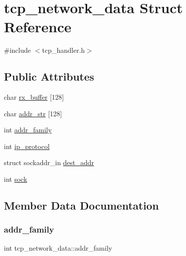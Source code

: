 \hypertarget{structtcp__network__data}{}\section{tcp\+\_\+network\+\_\+data Struct Reference}
\label{structtcp__network__data}


{\ttfamily \#include $<$tcp\+\_\+handler.\+h$>$}

\subsection*{Public Attributes}
\begin{DoxyCompactItemize}
\item 
char \hyperlink{structtcp__network__data_aec4bca454d64124cd3a4b001f4a551cc}{rx\+\_\+buffer} \mbox{[}128\mbox{]}
\item 
char \hyperlink{structtcp__network__data_a5bb07a33391c99faa2caab2ef4477944}{addr\+\_\+str} \mbox{[}128\mbox{]}
\item 
int \hyperlink{structtcp__network__data_a901043d5d480118c9e8661464465ae95}{addr\+\_\+family}
\item 
int \hyperlink{structtcp__network__data_ac9025540ea4138efba1544b3fbbb2db3}{ip\+\_\+protocol}
\item 
struct sockaddr\+\_\+in \hyperlink{structtcp__network__data_aac1fae2cd9f342a287fc728c2171e3d1}{dest\+\_\+addr}
\item 
int \hyperlink{structtcp__network__data_a78063825cce60cb5f121e2c87ccb6dbb}{sock}
\end{DoxyCompactItemize}


\subsection{Member Data Documentation}
\mbox{\label{structtcp__network__data_a901043d5d480118c9e8661464465ae95}} 
\subsubsection{\texorpdfstring{addr\+\_\+family}{addr\_family}}
{\footnotesize\ttfamily int tcp\+\_\+network\+\_\+data\+::addr\+\_\+family}

